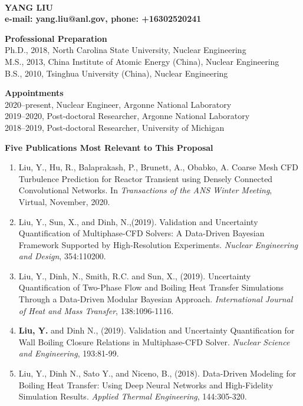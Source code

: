 \documentclass[11pt,letterpaper,english]{article}
\begin{document}
\setlength{\parindent}{0in} %

\pagestyle{fancy}   \renewcommand{%
\headrulewidth}{0.0pt}

\\
{\bf YANG LIU}\\
{\bf e-mail: yang.liu@anl.gov, phone: +16302520241} \smallskip

\begin{flushleft} {\bf Professional Preparation}
{\parindent 16pt
   ~\\
   Ph.D., 2018, North Carolina State University, Nuclear Engineering \\
   M.S.,  2013, China Institute of Atomic Energy (China), Nuclear Engineering \\
   B.S.,  2010, Tsinghua University (China), Nuclear Engineering \\
}

\vspace{.04in}
{\bf Appointments}
{\parindent 16pt
  ~\\
  2020--present, Nuclear Engineer, Argonne National Laboratory \\
  2019--2020, Post-doctoral Researcher, Argonne National Laboratory\\
  2018--2019, Post-doctoral Researcher, University of Michigan\\
}

\vspace{.04in}
{\bf Five Publications Most Relevant to This Proposal}
\vspace{-6pt}
\begin{enumerate} \itemsep1pt \parskip0pt 
\item Liu, Y., Hu, R., Balaprakash, P., Brunett, A., Obabko, A. Coarse Mesh CFD Turbulence Prediction for Reactor Transient using Densely Connected Convolutional Networks. In \textit{Transactions of the ANS Winter Meeting}, Virtual, November, 2020.
\item Liu, Y., Sun, X., and Dinh, N.,(2019). Validation and Uncertainty Quantification of Multiphase-CFD Solvers: A Data-Driven Bayesian Framework Supported by High-Resolution Experiments. \textit{Nuclear Engineering and Design}, 354:110200.
\item Liu, Y., Dinh, N., Smith, R.C. and Sun, X., (2019). Uncertainty Quantification of Two-Phase Flow and Boiling Heat Transfer Simulations Through a Data-Driven Modular Bayesian Approach. \textit{International Journal of Heat and Mass Transfer}, 138:1096-1116.
\item \textbf{Liu, Y.} and Dinh N., (2019). Validation and Uncertainty Quantification for Wall Boiling Closure Relations in Multiphase-CFD Solver. \textit{Nuclear Science and Engineering}, 193:81-99.
\item Liu, Y., Dinh N., Sato Y., and Niceno, B., (2018). Data-Driven Modeling for Boiling Heat Transfer: Using Deep Neural Networks and High-Fidelity Simulation Results. \textit{Applied Thermal Engineering}, 144:305-320.
\end{enumerate}


\end{flushleft}
\end{document}
